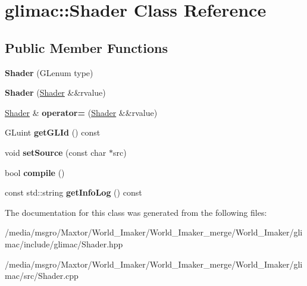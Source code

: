 \hypertarget{classglimac_1_1Shader}{}\section{glimac\+:\+:Shader Class Reference}
\label{classglimac_1_1Shader}
\subsection*{Public Member Functions}
\begin{DoxyCompactItemize}
\item 
\mbox{\label{classglimac_1_1Shader_a064a1d24851c1c405d3c912cff9521c4}} 
{\bfseries Shader} (G\+Lenum type)
\item 
\mbox{\label{classglimac_1_1Shader_a98bf794b782f89a7a5c859607e6dc62b}} 
{\bfseries Shader} (\hyperlink{classglimac_1_1Shader}{Shader} \&\&rvalue)
\item 
\mbox{\label{classglimac_1_1Shader_a0790eeb7a9fc154161bee6b78e287828}} 
\hyperlink{classglimac_1_1Shader}{Shader} \& {\bfseries operator=} (\hyperlink{classglimac_1_1Shader}{Shader} \&\&rvalue)
\item 
\mbox{\label{classglimac_1_1Shader_a46c21c4b6b9ee89426b458695897202e}} 
G\+Luint {\bfseries get\+G\+L\+Id} () const
\item 
\mbox{\label{classglimac_1_1Shader_a66701118e7f1d789a258936c82b32874}} 
void {\bfseries set\+Source} (const char $\ast$src)
\item 
\mbox{\label{classglimac_1_1Shader_a1e6c6814a6275dd698b3befdb89aa647}} 
bool {\bfseries compile} ()
\item 
\mbox{\label{classglimac_1_1Shader_aa0de6702041087187d8eca874000cfa6}} 
const std\+::string {\bfseries get\+Info\+Log} () const
\end{DoxyCompactItemize}


The documentation for this class was generated from the following files\+:\begin{DoxyCompactItemize}
\item 
/media/msgro/\+Maxtor/\+World\+\_\+\+Imaker/\+World\+\_\+\+Imaker\+\_\+merge/\+World\+\_\+\+Imaker/glimac/include/glimac/Shader.\+hpp\item 
/media/msgro/\+Maxtor/\+World\+\_\+\+Imaker/\+World\+\_\+\+Imaker\+\_\+merge/\+World\+\_\+\+Imaker/glimac/src/Shader.\+cpp\end{DoxyCompactItemize}
